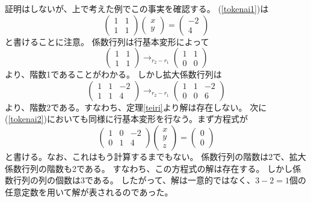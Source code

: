 \documentclass[10pt]{jsreport}
\theoremstyle{definition}%
\newcommand{\kakko}[1]{\left(#1 \right)} %
\numberwithin{equation}{section}%
\begin{document}
証明はしないが、上で考えた例でこの事実を確認する。
(\ref{tokenai1})は
\begin{equation}
  \begin{pmatrix}
    1 & 1\\
    1 & 1 
  \end{pmatrix}\begin{pmatrix}
    x\\
    y
  \end{pmatrix}
  =
  \begin{pmatrix}
    -2\\
    4
  \end{pmatrix}
\end{equation}
と書けることに注意。
係数行列は行基本変形によって
\begin{equation}
  \begin{pmatrix}
    1 & 1 \\
    1 & 1 
  \end{pmatrix}\to_{r_{2}-r_{1}}
  \begin{pmatrix}
    1 & 1 \\
    0 & 0 
  \end{pmatrix}
\end{equation}
より、階数1であることがわかる。
しかし拡大係数行列は
\begin{equation}
  \kakko{\begin{array}{cc|c}  
    1 & 1 & -2\\
    1 & 1 & 4 
   \end{array}}\to_{r_{2}-r_{1}}
   \kakko{\begin{array}{cc|c}  
    1 & 1 & -2\\
    0 & 0 & 6 
   \end{array}}
\end{equation}
より、階数2である。すなわち、定理\ref{teiri}より解は存在しない。
次に(\ref{tokenai2})においても同様に行基本変形を行なう。まず方程式が
\begin{equation}
  \begin{pmatrix}
    1 & 0 & -2 \\
    0 & 1 & 4 
  \end{pmatrix}
  \begin{pmatrix}
    x\\
    y\\
    z
  \end{pmatrix}=\begin{pmatrix}
    0\\
    0
  \end{pmatrix}
\end{equation}
と書ける。なお、これはもう計算するまでもない。
係数行列の階数は2で、拡大係数行列の階数も2である。
すなわち、この方程式の解は存在する。
しかし係数行列の列の個数は3である。
したがって、解は一意的ではなく、$3-2=1$個の任意定数を用いて解が表されるのであった。
\end{document}
